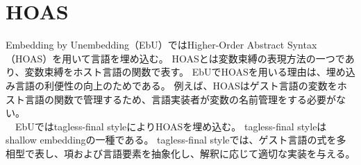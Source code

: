 \documentclass[uplatex]{sumiilab-paper}
\theoremstyle{mystyle}
\numberwithin{definition}{chapter} %
\begin{document}
\section{HOAS}
Embedding by Unembedding（EbU）ではHigher-Order Abstract Syntax（HOAS）を用いて言語を埋め込む。
HOASとは変数束縛の表現方法の一つであり、変数束縛をホスト言語の関数で表す。
EbUでHOASを用いる理由は、埋め込み言語の利便性の向上のためである。
例えば、HOASはゲスト言語の変数をホスト言語の関数で管理するため、言語実装者が変数の名前管理をする必要がない。\\
　EbUではtagless-final style\cite{CARETTE_KISELYOV_SHAN_2009}によりHOASを埋め込む。
tagless-final styleはshallow embeddingの一種である。
tagless-final styleでは、ゲスト言語の式を多相型で表し、項および言語要素を抽象化し、解釈に応じて適切な実装を与える。\\
\end{document}
